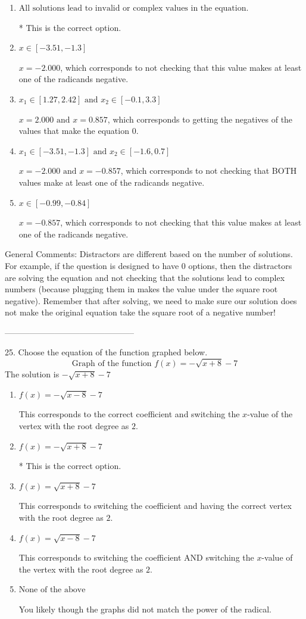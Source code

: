 \documentclass{article}[14pt]
\begin{document}
\begin{enumerate}[label=\Alph*.] 
\item $ \text{All solutions lead to invalid or complex values in the equation.} $ 

 * This is the correct option. 
\item $ x \in [-3.51,-1.3] $ 

 $x = -2.000$, which corresponds to not checking that this value makes at least one of the radicands negative. 
\item $ x_1 \in [1.27, 2.42] \text{ and } x_2 \in [-0.1,3.3] $ 

 $x = 2.000 \text{ and } x = 0.857$, which corresponds to getting the negatives of the values that make the equation 0. 
\item $ x_1 \in [-3.51, -1.3] \text{ and } x_2 \in [-1.6,0.7] $ 

 $x = -2.000 \text{ and } x = -0.857$, which corresponds to not checking that BOTH values make at least one of the radicands negative. 
\item $ x \in [-0.99,-0.84] $ 

 $x = -0.857$, which corresponds to not checking that this value makes at least one of the radicands negative. 
\end{enumerate} 
 
General Comments: Distractors are different based on the number of solutions. For example, if the question is designed to have 0 options, then the distractors are solving the equation and not checking that the solutions lead to complex numbers (because plugging them in makes the value under the square root negative). Remember that after solving, we need to make sure our solution does not make the original equation take the square root of a negative number!

-----------------------------------------------

25. Choose the equation of the function graphed below.
$$ \text{Graph of the function } f(x) = - \sqrt{x + 8} - 7 $$ 
The solution is $ - \sqrt{x + 8} - 7 $ 

\begin{enumerate}[label=\Alph*.] 
\item $ f(x) = - \sqrt{x - 8} - 7 $ 

 This corresponds to the correct coefficient and switching the $x$-value of the vertex with the root degree as $2$. 
\item $ f(x) = - \sqrt{x + 8} - 7 $ 

 * This is the correct option. 
\item $ f(x) = \sqrt{x + 8} - 7 $ 

 This corresponds to switching the coefficient and having the correct vertex with the root degree as $2$. 
\item $ f(x) = \sqrt{x - 8} - 7 $ 

 This corresponds to switching the coefficient AND switching the $x$-value of the vertex with the root degree as $2$. 
\item $ \text{None of the above} $ 

 You likely though the graphs did not match the power of the radical. 
\end{enumerate} 
 
\end{document}
